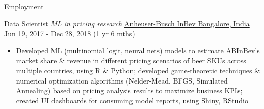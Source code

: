 \documentclass[]{mcdowellcv}
\begin{document}
\begin{cvsection}{Employment}
  \begin{cvsubsection}
    {Data Scientist \linebreak \textit{ML in pricing research}}
    {\href{https://www.abinbev-india.com/}{Anheuser-Busch InBev \linebreak Bangalore, India}}
    {Jun 19, 2017 - Dec 28, 2018 (1 yr 6 mths)}
    \begin{itemize}
      \item
            Developed ML (multinomial logit, neural nets) models to estimate
            ABInBev's market share \& revenue in different pricing scenarios of
            beer SKUs across multiple countries, using
            \href{https://www.r-project.org/about.html}{R} \&
            \href{https://www.python.org/}{Python}; developed game-theoretic
            techniques \& numerical optimization algorithms (Nelder-Mead, BFGS,
            Simulated Annealing) based on pricing analysis results to maximize
            business KPIs; created UI dashboards for consuming model reports,
            using \href{https://shiny.rstudio.com/}{Shiny},
            \href{https://posit.co/}{RStudio}
    \end{itemize}
  \end{cvsubsection}
\end{cvsection}
\end{document}
